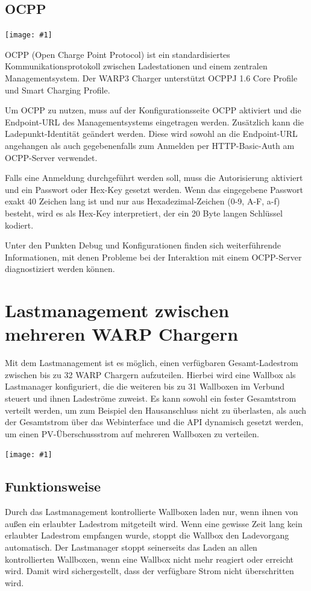 \documentclass[a4paper,10pt]{article}
\newcommand{\gfx}[1]{\texttt{[image: \#1]}}
\begin{document}
\begin{multicols*}{2}
    \subsection{OCPP}
    \gfx{./img_warp3/resized/web_ocpp}

    OCPP (Open Charge Point Protocol) ist ein standardisiertes Kommunikationsprotokoll zwischen
    Ladestationen und einem zentralen Managementsystem. Der WARP3 Charger
    unterstützt OCPPJ 1.6 Core Profile und Smart Charging Profile.

    Um OCPP zu nutzen, muss auf der Konfigurationsseite OCPP aktiviert und die
    Endpoint-URL des Managementsystems eingetragen werden. Zusätzlich kann die Ladepunkt-Identität
    geändert werden. Diese wird sowohl an die Endpoint-URL angehangen als auch gegebenenfalls zum
    Anmelden per HTTP-Basic-Auth am OCPP-Server verwendet.

    Falls eine Anmeldung durchgeführt werden soll, muss die Autorisierung aktiviert
    und ein Passwort oder Hex-Key gesetzt werden. Wenn das eingegebene Passwort exakt 40 Zeichen lang ist
    und nur aus Hexadezimal-Zeichen (0-9, A-F, a-f) besteht, wird es als Hex-Key interpretiert, der ein 20
    Byte langen Schlüssel kodiert.

    Unter den Punkten Debug und Konfigurationen finden sich weiterführende Informationen, mit denen Probleme
    bei der Interaktion mit einem OCPP-Server diagnostiziert werden können.

	\newpage
    \section{Lastmanagement zwischen mehreren WARP Chargern}\label{charge_manager}
    Mit dem Lastmanagement ist es möglich, einen verfügbaren Gesamt-Ladestrom
    zwischen bis zu 32 WARP Chargern aufzuteilen. Hierbei wird eine Wallbox als
    Lastmanager konfiguriert, die die weiteren bis zu 31 Wallboxen im Verbund steuert und ihnen Ladeströme
    zuweist. Es kann sowohl ein fester Gesamtstrom verteilt werden, um zum Beispiel den Hausanschluss nicht zu überlasten,
    als auch der Gesamtstrom über das Webinterface und die API dynamisch gesetzt
	werden, um einen PV-Überschussstrom auf mehreren Wallboxen zu verteilen.

    \gfx{./img_warp3/resized/web_charge_manager_settings}

    \subsection{Funktionsweise}
    Durch das Lastmanagement kontrollierte Wallboxen laden nur,
    wenn ihnen von außen ein erlaubter Ladestrom mitgeteilt wird. Wenn eine gewisse Zeit lang
    kein erlaubter Ladestrom empfangen wurde, stoppt die Wallbox den Ladevorgang automatisch.
    Der Lastmanager stoppt seinerseits das Laden an allen kontrollierten Wallboxen,
    wenn eine Wallbox nicht mehr reagiert oder erreicht wird. Damit wird sichergestellt,
    dass der verfügbare Strom nicht überschritten wird.


\end{multicols*}
\end{document}
